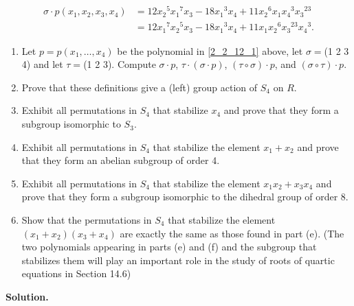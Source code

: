 \begin{enumerate}
                  \begin{align*}
                     \sigma \cdot p(x_1, x_2, x_3, x_4) &= 12{x_2}^5{x_1}^7x_3 -
                        18{x_1}^3x_4 + 11{x_2}^6x_1{x_4}^3{x_3}^{23} \\
                        &= 12{x_1}^7{x_2}^5x_3 -
                        18{x_1}^3x_4 + 11x_1{x_2}^6{x_3}^{23}{x_4}^3.
                  \end{align*}

                  \begin{enumerate}
                     \item Let $p = p(x_1, \ldots, x_4)$ be the polynomial in
                           \eqref{2_2_12_1} above, let $\sigma =$(1 2 3 4) and
                           let $\tau = $(1 2 3). Compute $\sigma \cdot p$,
                           $\tau \cdot (\sigma \cdot p)$,
                           $(\tau \circ \sigma) \cdot p$, and
                           $(\sigma \circ \tau) \cdot p$.
                     \item Prove that these definitions give a (left) group
                           action of $S_4$ on $R$.
                     \item Exhibit all permutations in $S_4$ that stabilize
                           $x_4$ and prove that they form a subgroup isomorphic
                           to $S_3$.
                     \item Exhibit all permutations in $S_4$ that stabilize the
                           element $x_1 + x_2$ and prove that they form an
                           abelian subgroup of order 4.
                     \item Exhibit all permutations in $S_4$ that stabilize the
                           element $x_1x_2 + x_3x_4$ and prove that they form a
                           subgroup isomorphic to the dihedral group of order 8.
                     \item Show that the permutations in $S_4$ that stabilize
                           the element $(x_1 + x_2)(x_3 + x_4)$ are exactly the
                           same as those found in part (e). (The two polynomials
                           appearing in parts (e) and (f) and the subgroup that
                           stabilizes them will play an important role in the
                           study of roots of quartic equations in Section 14.6)
                  \end{enumerate}

      \textbf{Solution.}


\end{enumerate}
